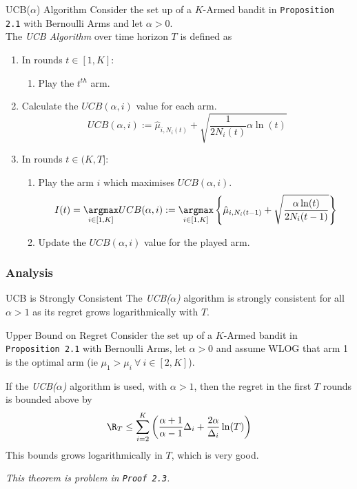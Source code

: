 \documentclass[11pt,a4paper]{article}
\begin{document}
  \begin{definition}{UCB($\alpha$) Algorithm}
    Consider the set up of a $K$-Armed bandit in \texttt{Proposition 2.1} with Bernoulli Arms and let $\alpha>0$.\\
    The \textit{UCB Algorithm} over time horizon $T$ is defined as
    \begin{enumerate}
      \item In rounds $t\in[1,K]$:
      \begin{enumerate}
        \item Play the $t^{th}$ arm.
      \end{enumerate}
      \item Calculate the $UCB(\alpha,i)$ value for each arm.
      \[ UCB(\alpha,i):=\hat\mu_{i,N_i(t)}+\sqrt{\frac1{2N_i(t)}\alpha\ln(t)} \]
      \item In rounds $t\in(K,T]$:
      \begin{enumerate}
        \item Play the arm $i$ which maximises $UCB(\alpha,i)$.
        \[ I(t)=\underset{i\in[1,K]}{\argmax}UCB(\alpha,i):=\underset{i\in[1,K]}{\argmax}\left\{\hat\mu_{i,N_i(t-1)}+\sqrt{\frac{\alpha\ln(t)}{2N_i(t-1)}}\right\} \]
        \item Update the $UCB(\alpha,i)$ value for the played arm.
      \end{enumerate}
    \end{enumerate}
  \end{definition}

\subsubsection{Analysis}

  \begin{remark}{UCB is Strongly Consistent}
    The \textit{UCB($\alpha$)} algorithm is strongly consistent for all $\alpha>1$ as its regret grows logarithmically with $T$.
  \end{remark}

  \begin{theorem}{Upper Bound on Regret}
    Consider the set up of a $K$-Armed bandit in \texttt{Proposition 2.1} with Bernoulli Arms, let $\alpha>0$ and assume WLOG that arm 1 is the optimal arm (ie $\mu_1>\mu_i\ \forall\ i\in[2,K]$).
    \par If the \textit{UCB($\alpha$)} algorithm is used, with $\alpha>1$, then the regret in the first $T$ rounds is bounded above by
    \[ \R_T\leq\sum_{i=2}^K\left(\frac{\alpha+1}{\alpha-1}\Delta_i+\frac{2\alpha}{\Delta_i}\ln(T)\right) \]
    This bounds grows logarithmically in $T$, which is very good.
    \par \textit{This theorem is problem in \texttt{Proof 2.3}. }
  \end{theorem}
\end{document}
